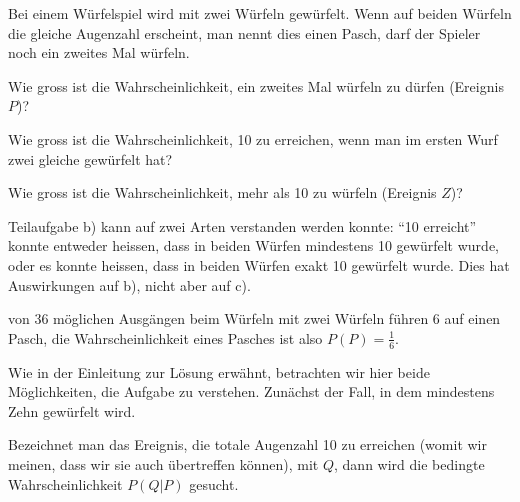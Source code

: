 Bei einem Würfelspiel wird mit zwei Würfeln gewürfelt. Wenn
auf beiden Würfeln die gleiche Augenzahl erscheint, man nennt dies
einen Pasch, darf
der Spieler noch ein zweites Mal würfeln.
\begin{teilaufgaben}
\item Wie gross ist die Wahrscheinlichkeit, ein zweites Mal würfeln
zu dürfen (Ereignis $P$)?
\item Wie gross ist die Wahrscheinlichkeit, 10 zu erreichen,
wenn man im ersten Wurf zwei gleiche gewürfelt hat?
\item Wie gross ist die
Wahrscheinlichkeit, mehr als 10 zu würfeln (Ereignis $Z$)?
\end{teilaufgaben}


\begin{loesung}
Teilaufgabe b) kann auf zwei
Arten verstanden werden konnte: ``10 erreicht'' konnte
entweder heissen, dass in beiden Würfen mindestens 10 gewürfelt wurde,
oder es konnte heissen, dass in beiden Würfen exakt 10 gewürfelt wurde.
Dies hat Auswirkungen auf b), nicht aber auf c).

\begin{teilaufgaben}
\item von 36 möglichen Ausgängen beim Würfeln mit zwei Würfeln
führen 6 auf einen Pasch, die Wahrscheinlichkeit eines Pasches
ist also $P(P)=\frac16$.
\item
Wie in der Einleitung zur Lösung erwähnt, betrachten wir hier beide
Möglichkeiten, die Aufgabe zu verstehen. Zunächst der Fall, in
dem mindestens Zehn gewürfelt wird.

Bezeichnet man das Ereignis, die totale Augenzahl 10 zu erreichen (womit
wir meinen, dass wir sie auch übertreffen können), mit
$Q$, dann wird die bedingte Wahrscheinlichkeit $P(Q|P)$ gesucht.


\end{teilaufgaben}
\end{loesung}
